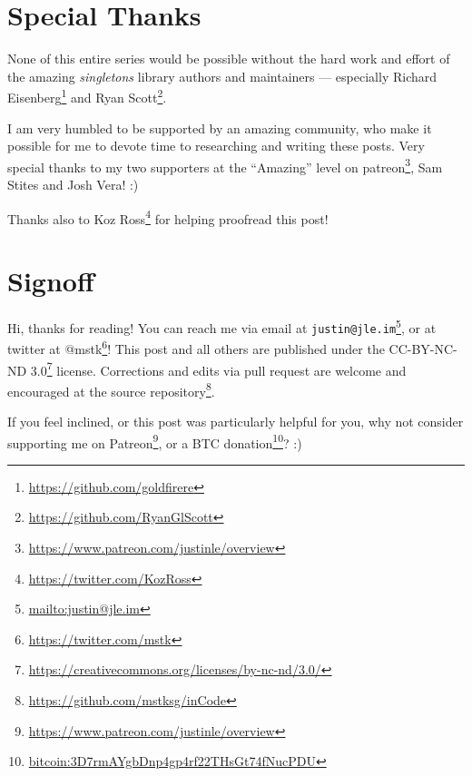 \documentclass[]{article}
\renewcommand{\href}[2]{#2\footnote{\url{#1}}}
\begin{document}
\hypertarget{special-thanks}{%
\section{Special Thanks}\label{special-thanks}}

None of this entire series would be possible without the hard work and effort of
the amazing \emph{singletons} library authors and maintainers --- especially
\href{https://github.com/goldfirere}{Richard Eisenberg} and
\href{https://github.com/RyanGlScott}{Ryan Scott}.

I am very humbled to be supported by an amazing community, who make it possible
for me to devote time to researching and writing these posts. Very special
thanks to my two supporters at the ``Amazing'' level on
\href{https://www.patreon.com/justinle/overview}{patreon}, Sam Stites and Josh
Vera! :)

Thanks also to \href{https://twitter.com/KozRoss}{Koz Ross} for helping
proofread this post!

\hypertarget{signoff}{%
\section{Signoff}\label{signoff}}

Hi, thanks for reading! You can reach me via email at
\href{mailto:justin@jle.im}{\nolinkurl{justin@jle.im}}, or at twitter at
\href{https://twitter.com/mstk}{@mstk}! This post and all others are published
under the \href{https://creativecommons.org/licenses/by-nc-nd/3.0/}{CC-BY-NC-ND
3.0} license. Corrections and edits via pull request are welcome and encouraged
at \href{https://github.com/mstksg/inCode}{the source repository}.

If you feel inclined, or this post was particularly helpful for you, why not
consider \href{https://www.patreon.com/justinle/overview}{supporting me on
Patreon}, or a \href{bitcoin:3D7rmAYgbDnp4gp4rf22THsGt74fNucPDU}{BTC donation}?
:)
\end{document}
